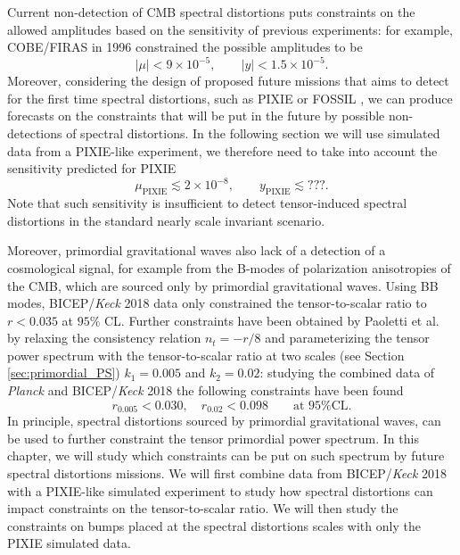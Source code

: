 \label{chap:constr}
Current non-detection of CMB spectral distortions puts constraints on the allowed amplitudes based on the sensitivity of previous experiments: for example, COBE/FIRAS \cite{COBE1996} in 1996 constrained the possible amplitudes to be 
\begin{equation}
    |\mu|<9\times10^{-5}, \qquad  |y|<1.5\times 10^{-5}.
\end{equation}
Moreover, considering the design of proposed future missions that aims to detect for the first time spectral distortions, such as PIXIE \cite{pixie,A_Kogut_2011} or FOSSIL \cite{IAS_Fossil}, we can produce forecasts on the constraints that will be put in the future by possible non-detections of spectral distortions. In the following section we will use simulated data from a PIXIE-like experiment, we therefore need to take into account the sensitivity predicted for PIXIE
\begin{equation}
    \label{eq:pix_sens} \mu_\text{PIXIE}\lesssim 2\times10^{-8}, \qquad y_\text{PIXIE}\lesssim???.
\end{equation}
Note that such sensitivity is insufficient to detect tensor-induced spectral distortions in the standard nearly scale invariant scenario.

Moreover, primordial gravitational waves also lack of a detection of a cosmological signal, for example from the B-modes of polarization anisotropies of the CMB, which are sourced only by primordial gravitational waves. Using BB modes, BICEP/\textit{Keck} 2018 data \cite{Ade_2021} only constrained the  tensor-to-scalar ratio to $r<0.035$ at $95\%$ CL. Further constraints have been obtained by Paoletti et al. \cite{Paoletti_2022} by relaxing the consistency relation $n_t=-r/8$ and parameterizing the tensor power spectrum with the tensor-to-scalar ratio at two scales (see  Section \ref{sec:primordial_PS}) $k_1=0.005$ and $k_2=0.02$: studying the combined data of \textit{Planck} \cite{planck2018results} and BICEP/\textit{Keck} 2018 \cite{Ade_2021} the following constraints have been found
\begin{equation}
    r_{0.005}<0.030,\quad r_{0.02}<0.098\qquad\text{at 95\% CL.}
\end{equation}
In principle, spectral distortions sourced by primordial gravitational waves, can be used to further constraint the tensor primordial power spectrum. In this chapter, we will study which constraints can be put on such spectrum by future spectral distortions missions. We will first combine data from BICEP/\textit{Keck} 2018 with a PIXIE-like simulated experiment to study how spectral distortions can impact constraints on the tensor-to-scalar ratio. We will then study the constraints on bumps placed at the spectral distortions scales with only the PIXIE simulated data.
